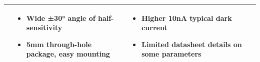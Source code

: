 \documentclass[class=report,11pt,crop=false]{standalone}
\begin{document}
\begin{table}[h]
\begin{center}
\begin{tabular}{|>{\centering\arraybackslash}m{2cm}|m{3.5cm}|m{5cm}|m{6.5cm}|}
\begin{itemize}
      \end{itemize} &
      \begin{itemize}
      \item Wide ±30° angle of half-sensitivity 
      \item 5mm through-hole package, easy mounting

      \end{itemize} &
    \begin{itemize}
      \item Higher 10nA typical dark current
      \item Limited datasheet details on some parameters
      \end{itemize}
      \\
      \hline
    \end{tabular}
  \end{center}
\end{table}
\end{document}
